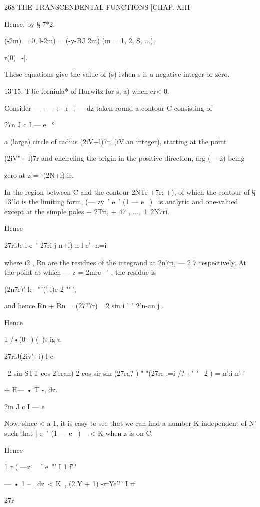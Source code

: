 268 THE TRANSCENDENTAL FUNCTIONS [CHAP. XIII

Hence, by § 7*2,

 (-2m) = 0, l-2m) = (-y-BJ 2m) (m = 1, 2, S, ...),

r(0)=-|.

These equations give the value of (s) ivhen s is a negative integer or
zero.

13"15. TJie forniula* of Hurwitz for s, a) when cr< 0.

Consider — - — ; - r- ; — dz taken round a contour C consisting of

27n J c I — e~ °

a (large) circle of radius (2iV+l)7r, (iV an integer), starting at the
point

(2iV"+ l)7r and encircling the origin in the positive direction, arg
(— z) being

zero at z = -(2N+l) ir.

In the region between C and the contour 2NTr +7r; +), of which the
contour of § 13"lo is the limiting form, (— zy~' e~' (1 — e~ )~ is
analytic and one-valued except at the simple poles + 2Tri, + 47 , ...,
± 2N7ri.

Hence



27riJc l-e~' 27ri j n+i) n l-e'- n=i

where i2 , Rn are the residues of the integrand at 2n7ri, — 2 7
respectively. At the point at which — z = 2mre~ ' , the residue is

(2n7r)'-le- '''('-l)e-2 "''',

and hence Rn + Rn = (27?7r) ~ 2 sin i ' " 2'n-an j .

Hence

1 /•(0+) (\ )s-ig-a



27riJ(2iv'+i) l-e-

\ 2 sin STT cos 2'rran) 2 cos sir sin (27ra? ) " "(27rr ,=i /? - " ' \
2 ) = n':i n'-'

+ H— • T -, dz.

2in J c I — e

Now, since < a 1, it is easy to see that we can find a number K
independent of N' such that | e~" (1 — e~ )~ \ < K when z is on C.

Hence

1 r ( —z\ \ ~' e~"' I 1 f""

— • 1 -- . dz\ < K\ , (2.Y + 1) -rrYe'"' I rf



27r



